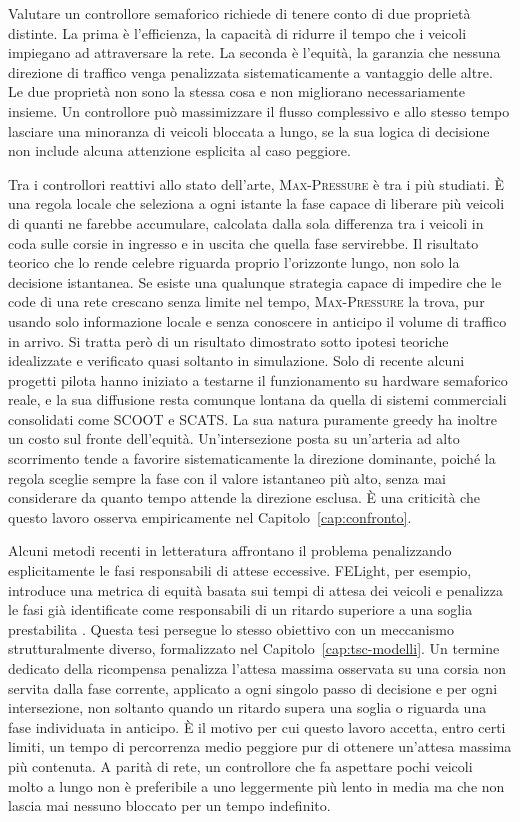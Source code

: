 Valutare un controllore semaforico richiede di tenere conto di due
proprietà distinte. La prima è l'efficienza, la capacità di ridurre il
tempo che i veicoli impiegano ad attraversare la rete. La seconda è
l'equità, la garanzia che nessuna direzione di traffico venga penalizzata
sistematicamente a vantaggio delle altre. Le due proprietà non sono la
stessa cosa e non migliorano necessariamente insieme. Un controllore può
massimizzare il flusso complessivo e allo stesso tempo lasciare una
minoranza di veicoli bloccata a lungo, se la sua logica di decisione non
include alcuna attenzione esplicita al caso peggiore.

Tra i controllori reattivi allo stato dell'arte, \textsc{Max-Pressure}
\citep{varaiya2013maxpressure} è tra i più studiati. È una regola locale
che seleziona a ogni istante la fase capace di liberare più veicoli di
quanti ne farebbe accumulare, calcolata dalla sola differenza tra i
veicoli in coda sulle corsie in ingresso e in uscita che quella fase
servirebbe. Il risultato teorico che lo rende celebre riguarda proprio
l'orizzonte lungo, non solo la decisione istantanea. Se esiste una
qualunque strategia capace di impedire che le code di una rete crescano
senza limite nel tempo, \textsc{Max-Pressure} la trova, pur usando solo
informazione locale e senza conoscere in anticipo il volume di traffico
in arrivo. Si tratta però di un risultato dimostrato sotto ipotesi
teoriche idealizzate e verificato quasi soltanto in simulazione. Solo di
recente alcuni progetti pilota hanno iniziato a testarne il funzionamento
su hardware semaforico reale, e la sua diffusione resta comunque lontana
da quella di sistemi commerciali consolidati come SCOOT e SCATS. La sua
natura puramente greedy ha inoltre un costo sul fronte dell'equità.
Un'intersezione posta su un'arteria ad alto scorrimento tende a favorire
sistematicamente la direzione dominante, poiché la regola sceglie sempre
la fase con il valore istantaneo più alto, senza mai considerare da
quanto tempo attende la direzione esclusa. È una criticità che questo
lavoro osserva empiricamente nel Capitolo~\ref{cap:confronto}.

Alcuni metodi recenti in letteratura affrontano il problema penalizzando
esplicitamente le fasi responsabili di attese eccessive. FELight, per
esempio, introduce una metrica di equità basata sui tempi di attesa dei
veicoli e penalizza le fasi già identificate come responsabili di un
ritardo superiore a una soglia prestabilita \citep{xiao2025tscreview}.
Questa tesi persegue lo stesso obiettivo con un meccanismo strutturalmente
diverso, formalizzato nel Capitolo~\ref{cap:tsc-modelli}. Un termine
dedicato della ricompensa penalizza l'attesa massima osservata su una
corsia non servita dalla fase corrente, applicato a ogni singolo passo di
decisione e per ogni intersezione, non soltanto quando un ritardo supera
una soglia o riguarda una fase individuata in anticipo. È il motivo per
cui questo lavoro accetta, entro certi limiti, un tempo di percorrenza
medio peggiore pur di ottenere un'attesa massima più contenuta. A parità
di rete, un controllore che fa aspettare pochi veicoli molto a lungo non
è preferibile a uno leggermente più lento in media ma che non lascia mai
nessuno bloccato per un tempo indefinito.

